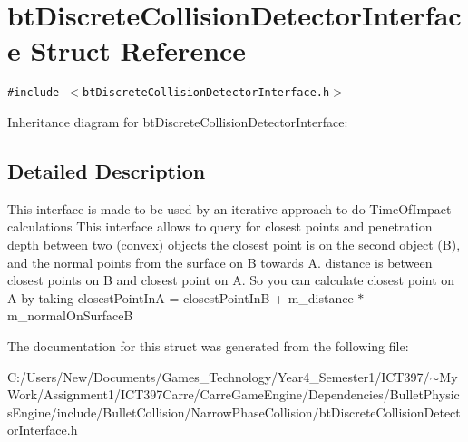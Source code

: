 \hypertarget{structbt_discrete_collision_detector_interface}{
\section{btDiscreteCollisionDetectorInterface Struct Reference}
\label{structbt_discrete_collision_detector_interface}
}
{\tt \#include $<$btDiscreteCollisionDetectorInterface.h$>$}

Inheritance diagram for btDiscreteCollisionDetectorInterface:

\subsection{Detailed Description}
This interface is made to be used by an iterative approach to do TimeOfImpact calculations This interface allows to query for closest points and penetration depth between two (convex) objects the closest point is on the second object (B), and the normal points from the surface on B towards A. distance is between closest points on B and closest point on A. So you can calculate closest point on A by taking closestPointInA = closestPointInB + m\_\-distance $\ast$ m\_\-normalOnSurfaceB 

The documentation for this struct was generated from the following file:\begin{CompactItemize}
\item 
C:/Users/New/Documents/Games\_\-Technology/Year4\_\-Semester1/ICT397/$\sim$My Work/Assignment1/ICT397Carre/CarreGameEngine/Dependencies/BulletPhysicsEngine/include/BulletCollision/NarrowPhaseCollision/btDiscreteCollisionDetectorInterface.h\end{CompactItemize}
